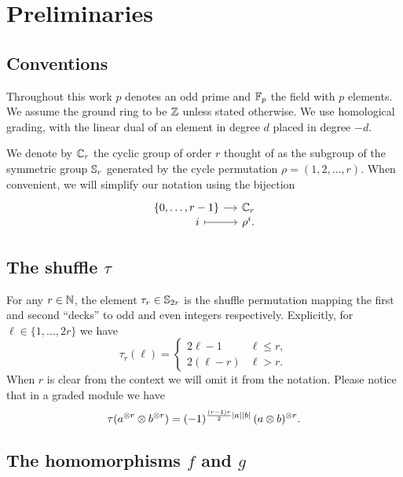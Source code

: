 
\section{Preliminaries}\label{s:preliminaries}

\subsection{Conventions}

Throughout this work $p$ denotes an odd prime and ${\mathbb{F}_p}$ the field with $p$ elements.
We assume the ground ring to be $\mathbb{Z}$ unless stated otherwise.
We use homological grading, with the linear dual of an element in degree $d$ placed in degree $-d$.

We denote by $\mathbb{C}_r$ the cyclic group of order $r$ thought of as the subgroup of the symmetric group $\mathbb{S}_r$ generated by the cycle permutation $\rho = (1,2,\dots,r)$.
When convenient, we will simplify our notation using the bijection
\[
\begin{tikzcd}[column sep=small,row sep=-5]
	\{0,\dots,r-1\} \rar & \cyc_r \\
	\qquad i \rar[maps to] & \rho^i.
\end{tikzcd}
\]

\subsection{The shuffle $\tau$}\label{ss:shuffle}

For any $r \in \mathbb{N}$, the element $\tau_r \in \mathbb{S}_{2r}$ is the shuffle permutation mapping the first and second ``decks'' to odd and even integers respectively.
Explicitly, for $\ell \in \{1,\dots,2r\}$ we have
\begin{equation*}
	\tau_r(\ell) =
	\begin{cases}
		2\ell-1 & \ell \leq r, \\
		2(\ell-r) & \ell > r.
	\end{cases}
\end{equation*}
When $r$ is clear from the context we will omit it from the notation.
Please notice that in a graded module we have
\[
\tau(a^{\otimes r} \otimes b^{\otimes r}) =
(-1)^{\frac{(r-1)r}{2}\lvert a\rvert\lvert b\rvert} \, (a \otimes b)^{\otimes r}.
\]

\subsection{The homomorphisms $f$ and $g$}\label{ss:f and g}

